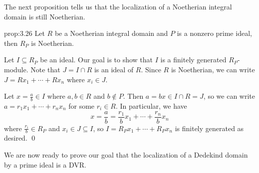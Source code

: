 The next proposition tells us that the localization of a Noetherian integral domain
is still Noetherian. 

\begin{prop}{prop:3.26}
    Let $R$ be a Noetherian integral domain and $P$ is a nonzero prime ideal, 
    then $R_P$ is Noetherian. 
\end{prop}\vspace{-0.25cm}
\begin{pf}
    Let $I \subseteq R_P$ be an ideal. Our goal is to show that 
    $I$ is a finitely generated $R_P$-module. Note that 
    $J = I \cap R$ is an ideal of $R$. Since $R$ is Noetherian, we can 
    write $J = Rx_1 + \cdots + Rx_n$ where $x_i \in J$. 
    
    Let $x = \frac{a}{b} \in I$ where $a, b \in R$ and $b \notin P$. Then 
    $a = bx \in I \cap R = J$, so we can write 
    $a = r_1 x_1 + \cdots + r_n x_n$ for some $r_i \in R$. In particular, 
    we have 
    \[ x = \frac{a}{b} = \frac{r_1}{b} x_1 + \cdots + \frac{r_n}{b} x_n \] 
    where $\frac{r_i}{b} \in R_P$ and $x_i \in J \subseteq I$, so 
    $I = R_P x_1 + \cdots + R_P x_n$ is finitely generated as desired. \qed
\end{pf}\vspace{-0.25cm}

We are now ready to prove our goal that the localization of a Dedekind 
domain by a prime ideal is a DVR. 

